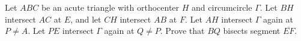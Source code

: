 Let $ABC$ be an acute triangle with orthocenter $H$ and circumcircle $\Gamma$. Let $BH$ intersect $AC$ at $E$, and let $CH$ intersect $AB$ at $F$. Let $AH$ intersect $\Gamma$ again at $P \neq A$. Let $PE$ intersect $\Gamma$ again at $Q \neq P$. Prove that $BQ$ bisects segment $\overline{EF}$.


